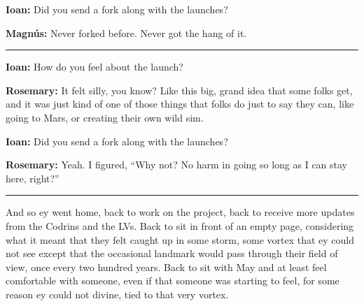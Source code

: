 \textbf{Ioan:} Did you send a fork along with the launches?

\textbf{Magnús:} Never forked before. Never got the hang of it.

\begin{center}\rule{0.5\linewidth}{0.5pt}\end{center}

\textbf{Ioan:} How do you feel about the launch?

\textbf{Rosemary:} It felt silly, you know? Like this big, grand idea that some folks get, and it was just kind of one of those things that folks do just to say they can, like going to Mars, or creating their own wild sim.

\textbf{Ioan:} Did you send a fork along with the launches?

\textbf{Rosemary:} Yeah. I figured, ``Why not? No harm in going so long as I can stay here, right?''

\begin{center}\rule{0.5\linewidth}{0.5pt}\end{center}

And so ey went home, back to work on the project, back to receive more updates from the Codrins and the LVs. Back to sit in front of an empty page, considering what it meant that they felt caught up in some storm, some vortex that ey could not see except that the occasional landmark would pass through their field of view, once every two hundred years. Back to sit with May and at least feel comfortable with someone, even if that someone was starting to feel, for some reason ey could not divine, tied to that very vortex.
